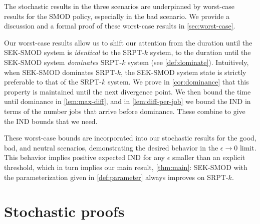 \documentclass[acmsmall]{acmart}
\begin{document}
The stochastic results in the three scenarios are underpinned by worst-case results for the SMOD policy, especially in the bad scenario.
We provide a discussion and a formal proof of these worst-case results in \cref{sec:worst-case}.

Our worst-case results allow us to shift our attention from the duration until the SEK-SMOD system is \emph{identical} to the SRPT-$k$ system, to the duration until the SEK-SMOD system \emph{dominates} SRPT-$k$ system (see \cref{def:dominate}). Intuitively, when SEK-SMOD dominates SRPT-$k$, the SEK-SMOD system state is strictly preferable to that of the SRPT-$k$ system. We prove in \cref{cor:dominance} that this property is maintained until the next divergence point. We then bound the time until dominance in \cref{lem:max-diff}, and in \cref{lem:diff-per-job} we bound the IND in terms of the number jobs that arrive before dominance.
These combine to give the IND bounds that we need.

These worst-case bounds are incorporated into our stochastic results for the good, bad, and neutral scenarios, demonstrating the desired behavior in the $\epsilon \to 0$ limit. This behavior implies positive expected IND for any $\epsilon$ smaller than an explicit threshold, which in turn implies our main result, \cref{thm:main}: SEK-SMOD with the parameterization given in \cref{def:parameter} always improves on SRPT-$k$.


\section{Stochastic proofs}
\label{sec:stochastic}
\end{document}
